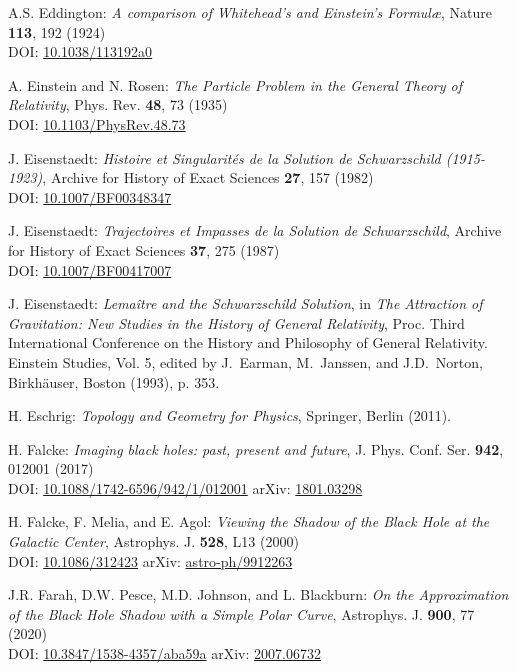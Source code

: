 \begin{thebibliography}{123}
A.S. Eddington: {\em A comparison of Whitehead's and Einstein's Formul\ae},
Nature {\bf 113}, 192 (1924) \\
DOI: \href{https://doi.org/10.1038/113192a0}{10.1038/113192a0}

A. Einstein and N. Rosen:
{\em The Particle Problem in the General Theory of Relativity},
Phys. Rev. {\bf 48}, 73 (1935) \\
DOI: \href{https://doi.org/10.1103/PhysRev.48.73}{10.1103/PhysRev.48.73}

J. Eisenstaedt:
{\em Histoire et Singularit\'es de la Solution de Schwarzschild (1915-1923)},
Archive for History of Exact Sciences {\bf 27}, 157 (1982) \\
DOI: \href{https://doi.org/10.1007/BF00348347}{10.1007/BF00348347}

J. Eisenstaedt:
{\em Trajectoires et Impasses de la Solution de Schwarzschild},
Archive for History of Exact Sciences {\bf 37}, 275 (1987) \\
DOI: \href{https://doi.org/10.1007/BF00417007}{10.1007/BF00417007}

J. Eisenstaedt: {\em Lemaître and the Schwarzschild Solution}, in
{\em The Attraction of Gravitation: New Studies in the History of
General Relativity}, Proc. Third International Conference on the History and Philosophy of General Relativity. Einstein
Studies, Vol. 5, edited by J.~Earman, M.~Janssen, and J.D.~Norton,
Birkhäuser, Boston (1993), p. 353.

H. Eschrig: {\em Topology and Geometry for Physics},
Springer, Berlin (2011).

H. Falcke:
{\em Imaging black holes: past, present and future},
J. Phys. Conf. Ser. {\bf 942}, 012001 (2017)\\
DOI: \href{https://doi.org/10.1088/1742-6596/942/1/012001}{10.1088/1742-6596/942/1/012001}\hfill
arXiv: \href{https://arxiv.org/abs/1801.03298}{1801.03298}

H. Falcke, F. Melia, and E. Agol:
{\em Viewing the Shadow of the Black Hole at the Galactic Center},
Astrophys. J. {\bf 528}, L13 (2000)\\
DOI: \href{https://doi.org/10.1086/312423}{10.1086/312423}\hfill
arXiv: \href{https://arxiv.org/abs/astro-ph/9912263}{astro-ph/9912263}

J.R. Farah, D.W. Pesce, M.D. Johnson, and L. Blackburn:
{\em On the Approximation of the Black Hole Shadow with a Simple Polar Curve},
Astrophys. J. {\bf 900}, 77 (2020)\\
DOI: \href{https://doi.org/10.3847/1538-4357/aba59a}{10.3847/1538-4357/aba59a}\hfill
arXiv: \href{https://arxiv.org/abs/2007.06732}{2007.06732}


\end{thebibliography}
